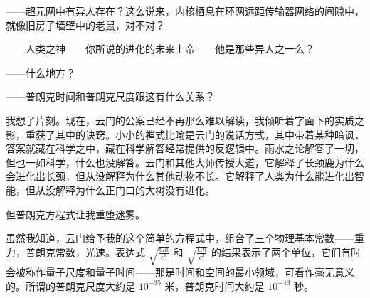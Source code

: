 \documentclass[AutoFakeBold=true]{book}
\begin{document}
{\kaishu ——超元网中有异人存在？这么说来，内核栖息在环网远距传输器网络的间隙中，就像旧房子墙壁中的老鼠，对不对？}

{}

{\kaishu ——人类之神——你所说的进化的未来上帝——他是那些异人之一么？}

{\heiti [不]}

{}

{\kaishu ——什么地方？}

{}

{\kaishu ——普朗克时间和普朗克尺度跟这有什么关系？}

{\heiti [嚇！]}

{}

\vspace*{1em}

我想了片刻。现在，云门的公案已经不再那么难以解读，我倾听着字面下的实质之影，重获了其中的诀窍。小小的禅式比喻是云门的说话方式，其中带着某种暗讽，答案就藏在科学之中，藏在科学解答经常提供的反逻辑中。雨水之论解答了一切，但也一如科学，什么也没解答。云门和其他大师传授大道，它解释了长颈鹿为什么会进化出长颈，但从没解释为什么其他动物不长。它解释了人类为什么能进化出智能，但从没解释为什么正门口的大树没有进化。

但普朗克方程式让我重堕迷雾。

虽然我知道，云门给予我的这个简单的方程式中，组合了三个物理基本常数——重力，普朗克常数，光速。表达式 $\sqrt{\frac{Gh}{c^5}}$ 和 $\sqrt{\frac{Gh}{c^3}}$ 的结果表示了两个单位，它们有时会被称作量子尺度和量子时间——那是时间和空间的最小领域，可看作毫无意义的。所谓的普朗克尺度大约是 $10^{-35}$ 米，普朗克时间大约是 $10^{-43}$ 秒。
\end{document}
